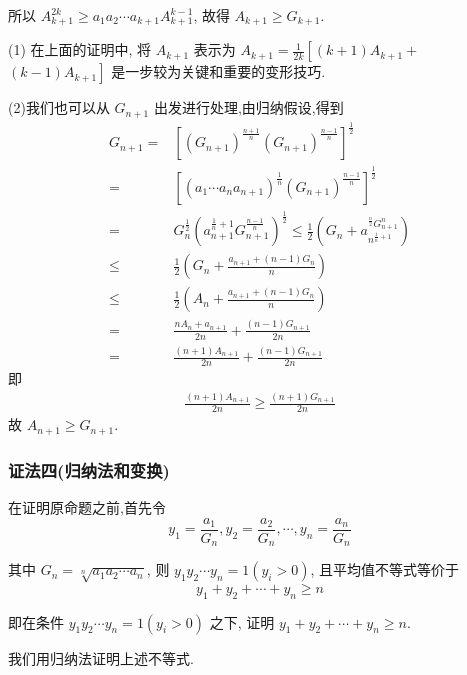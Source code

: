 所以 $A_{k+1}^{2 k} \geqslant a_{1} a_{2} \cdots a_{k+1} A_{k+1}^{k-1}$, 故得 $A_{k+1} \geqslant G_{k+1}$.

\begin{note}
(1) 在上面的证明中, 将 $A_{k+1}$ 表示为 $A_{k+1}=\frac{1}{2 k}\left[(k+1) A_{k+1}+\right.$ $\left.(k-1) A_{k+1}\right]$ 是一步较为关键和重要的变形技巧.

(2)我们也可以从 $G_{n+1}$ 出发进行处理,由归纳假设,得到
$$
\begin{aligned}
G_{n+1}= & {\left[\left(G_{n+1}\right)^{\frac{n+1}{n}}\left(G_{n+1}\right)^{\frac{n-1}{n}}\right]^{\frac{1}{2}} } \\
= & {\left[\left(a_{1} \cdots a_{n} a_{n+1}\right)^{\frac{1}{n}}\left(G_{n+1}\right)^{\frac{n-1}{n}}\right]^{\frac{1}{2}} } \\
= & G_{n}^{\frac{1}{2}}\left(a_{n+1}^{\frac{1}{n}+1} G_{n+1}^{\frac{n-1}{n}}\right)^{\frac{1}{2}} \leqslant \frac{1}{2}\left(G_{n}+a_{n^{\frac{1}{n}+1}}^{{ }^{\frac{n}{2}} G_{n+1}^{n}}\right) \\
\leqslant & \frac{1}{2}\left(G_{n}+\frac{a_{n+1}+(n-1) G_{n}}{n}\right) \\
\leqslant & \frac{1}{2}\left(A_{n}+\frac{a_{n+1}+(n-1) G_{n}}{n}\right) \\
= & \frac{n A_{n}+a_{n+1}}{2 n}+\frac{(n-1) G_{n+1}}{2 n} \\
= & \frac{(n+1) A_{n+1}}{2 n}+\frac{(n-1) G_{n+1}}{2 n} 
\end{aligned}
$$
即
\begin{align}
  \frac{(n+1) A_{n+1}}{2 n} \geqslant \frac{(n+1) G_{n+1}}{2 n}
\end{align}
故 $A_{n+1} \geqslant G_{n+1}$.
\end{note}

\subsubsection*{证法四(归纳法和变换)}

在证明原命题之前,首先令
$$
y_{1}=\frac{a_{1}}{G_{n}}, y_{2}=\frac{a_{2}}{G_{n}}, \cdots, y_{n}=\frac{a_{n}}{G_{n}}
$$

其中 $G_{n}=\sqrt[n]{a_{1} a_{2} \cdots a_{n}}$, 则 $y_{1} y_{2} \cdots y_{n}=1\left(y_{i}>0\right)$, 且平均值不等式等价于
$$
y_{1}+y_{2}+\cdots+y_{n} \geqslant n
$$

即在条件 $y_{1} y_{2} \cdots y_{n}=1\left(y_{i}>0\right)$ 之下, 证明 $y_{1}+y_{2}+\cdots+y_{n} \geqslant n$.

我们用归纳法证明上述不等式.

